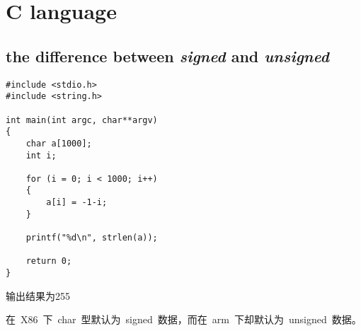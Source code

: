 \chapter{C language}

\section{the difference between \emph{signed} and \emph{unsigned}}
\begin{verbatim}
#include <stdio.h>
#include <string.h>

int main(int argc, char**argv)
{
	char a[1000];
	int i;

	for (i = 0; i < 1000; i++)
	{
		a[i] = -1-i;
	}

	printf("%d\n", strlen(a));

	return 0;
}
\end{verbatim}
输出结果为255

在~X86~下~char~型默认为~signed~数据，而在~arm~下却默认为~unsigned~数据。

